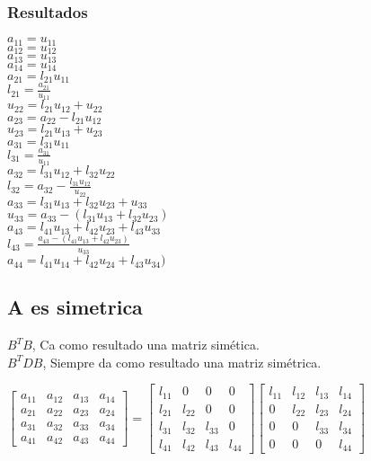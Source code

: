 \subsubsection{Resultados}
\begin{multicols}{2}
$a_{11}=u_{11}$ \\
$a_{12}=u_{12}$ \\
$a_{13}=u_{13}$ \\
$a_{14}=u_{14}$ \\
$a_{21}=l_{21}u_{11}$ \\
$l_{21}=\frac{a_{21}}{u_{11}}$ \\
$u_{22}=l_{21}u_{12}+u_{22}$ \\
$a_{23}=a_{22}-l_{21}u_{12}$ \\
$u_{23}=l_{21}u_{13}+u_{23}$ \\
$a_{31}=l_{31}u_{11}$ \\
$l_{31}=\frac{a_{31}}{u_{11}}$ \\
$a_{32}=l_{31}u_{12}+l_{32}u_{22}$ \\
$l_{32}=a_{32}-\frac{l_{31}u_{12}}{u_{22}}$ \\
$a_{33}=l_{31}u_{13}+l_{32}u_{23}+u_{33}$ \\
$u_{33}=a_{33}-(l_{31}u_{13}+l_{32}u_{23})$ \\
$a_{43}=l_{41}u_{13}+l_{42}u_{23}+l_{43}u_{33}$ \\
$l_{43}=\frac{a_{43}-(l_{41}u_{13}+l_{42}u_{23})}{u_{33}}$ \\
$a_{44}=l_{41}u_{14}+l_{42}u_{24}+l_{43}u_{34})$ \\
\end{multicols}
\subsection*{A es simetrica}
$B^TB$, Ca como resultado una matriz sim\'etica. \\
$B^TDB$, Siempre da como resultado una matriz sim\'etrica.
\begin{center}
$\begin{bmatrix}
a_{11} & a_{12} & a_{13} & a_{14} \\
a_{21} & a_{22} & a_{23} & a_{24} \\
a_{31} & a_{32} & a_{33} & a_{34} \\
a_{41} & a_{42} & a_{43} & a_{44} 
\end{bmatrix}=\begin{bmatrix}
l_{11} & 0 & 0 & 0 \\
l_{21} & l_{22} & 0 & 0 \\
l_{31} & l_{32} & l_{33} & 0 \\
l_{41} & l_{42} & l_{43} & l_{44} 
\end{bmatrix}\begin{bmatrix}
l_{11} & l_{12} & l_{13} & l_{14} \\
0 & l_{22} & l_{23} & l_{24} \\
0 & 0 & l_{33} & l_{34} \\
0 & 0 & 0 & l_{44} 
\end{bmatrix} $
\end{center}

